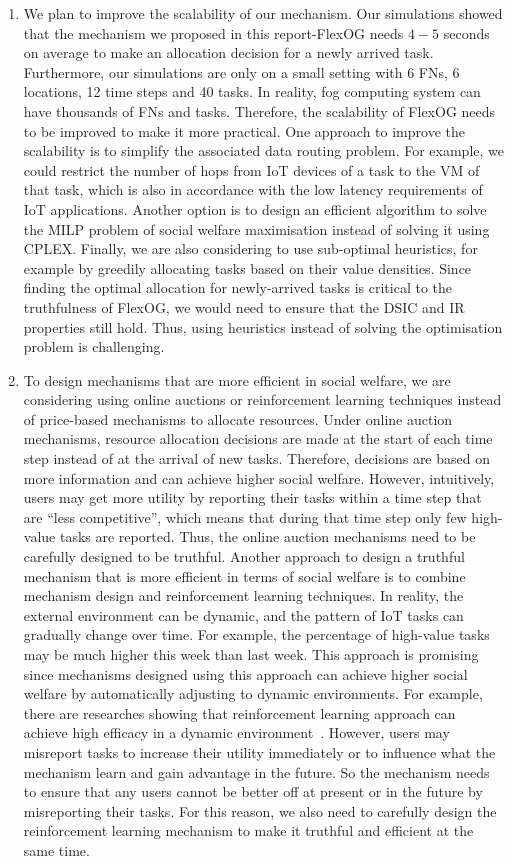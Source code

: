 \documentclass[11pt]{phdthesis}
\begin{document}
\begin{enumerate}
	\item We plan to improve the scalability of our mechanism. Our simulations showed that the mechanism we proposed in this report-FlexOG needs
	$ 4-5 $ seconds on average to make an allocation decision for a newly arrived task. Furthermore, our simulations are only on a small setting with 6 FNs, 6 locations, 12 time steps and 40 tasks. In reality, fog computing system can have thousands of FNs and tasks. Therefore, the scalability of FlexOG needs to be improved to make it more practical. One approach to improve the scalability is to simplify the associated data routing problem. For example, we could restrict the number of hops from IoT devices of a task to the VM of that task, which is also in accordance with the low latency requirements of IoT applications. Another option is to design an efficient algorithm to solve the MILP problem of social welfare maximisation instead of solving it using CPLEX. Finally, we are also considering to use sub-optimal heuristics, for example by greedily allocating tasks based on their value densities. Since finding the optimal allocation for newly-arrived tasks is critical to the truthfulness of FlexOG, we would need to ensure that the DSIC and IR properties still hold. Thus, using heuristics instead of solving the optimisation problem is challenging.
	
	\item To design mechanisms that are more efficient in social welfare, we are considering using online auctions or reinforcement learning techniques instead of price-based mechanisms to allocate resources. Under online auction mechanisms, resource allocation decisions are made at the start of each time step instead of at the arrival of new tasks. Therefore, decisions are based on more information and can achieve higher social welfare. However, intuitively, users may get more utility by reporting their tasks within a time step that are ``less competitive'', which means that during that time step only few high-value tasks are reported. Thus, the online auction mechanisms need to be carefully designed to be truthful. Another approach to design a truthful mechanism that is more efficient in terms of social welfare is to combine mechanism design and reinforcement learning techniques. In reality, the external environment can be dynamic, and the pattern of IoT tasks can gradually change over time. For example, the percentage of high-value tasks may be much higher this week than last week. This approach is promising since mechanisms designed using this approach can achieve higher social welfare by automatically adjusting to dynamic environments. For example, there are researches showing that reinforcement learning approach can achieve high efficacy in a dynamic environment~\citep{aydin2000dynamic,cui2017reinforcement}. However, users may misreport tasks to increase their utility immediately or to influence what the mechanism learn and gain advantage in the future. So the mechanism needs to ensure that any users cannot be better off at present or in the future by misreporting their tasks. For this reason, we also need to carefully design the reinforcement learning mechanism to make it truthful and efficient at the same time. 
	

\end{enumerate}
\end{document}
